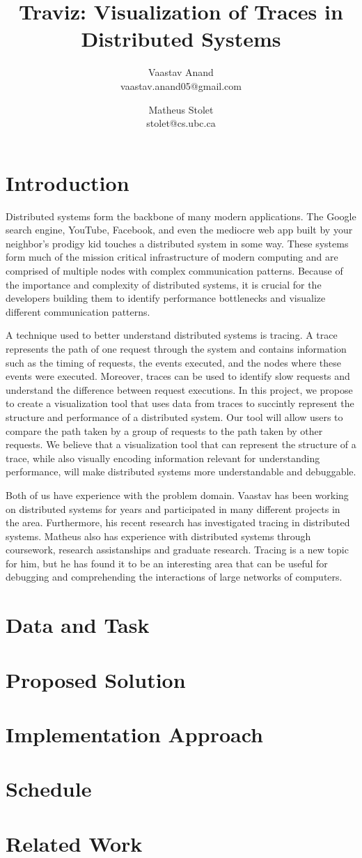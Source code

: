 \documentclass{article}
\title{Traviz: Visualization of Traces in Distributed Systems}
\author{Vaastav Anand \\ vaastav.anand05@gmail.com  \and Matheus Stolet \\ stolet@cs.ubc.ca}
\date{}
\begin{document}
\maketitle

\section{Introduction}

Distributed systems form the backbone of many modern applications. The Google search engine,
YouTube, Facebook, and even the mediocre web app built by your neighbor's prodigy kid touches
a distributed system in some way. These systems form much of the mission critical infrastructure
of modern computing and are comprised of multiple nodes with complex communication patterns. Because
of the importance and complexity of distributed systems, it is crucial for the developers building
them to identify performance bottlenecks and visualize different communication patterns. 

A technique used to better understand distributed systems is tracing. A trace represents the
path of one request through the system and contains information such as the timing of requests, 
the events executed, and the nodes where these events were executed. Moreover, traces can be used
to identify slow requests and understand the difference between request executions. In this project, we
propose to create a visualization tool that uses data from traces to succintly represent the structure 
and performance of a distributed system. Our tool will allow users to compare the path taken by a group
of requests to the path taken by other requests. We believe that a visualization tool that can represent the
structure of a trace, while also visually encoding information relevant for understanding performance,
will make distributed systems more understandable and debuggable.

Both of us have experience with the problem domain. Vaastav has been working on distributed systems for years
and participated in many different projects in the area. Furthermore, his recent research has investigated
tracing in distributed systems. Matheus also has experience with distributed systems through coursework,
research assistanships and graduate research. Tracing is a new topic for him, but he has found it to be
an interesting area that can be useful for debugging and comprehending the interactions of large networks
of computers.

\section{Data and Task}

\section{Proposed Solution}

\section{Implementation Approach}

\section{Schedule}

\section{Related Work}
\end{document}
